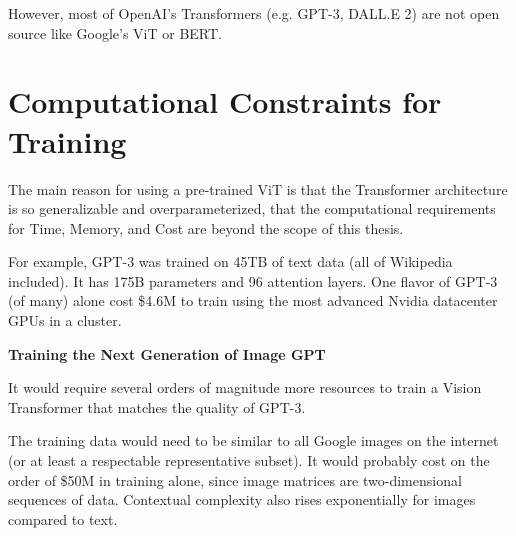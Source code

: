 \vspace{1mm}

However, most of OpenAI's Transformers (e.g. GPT-3, DALL.E 2) are not open source like Google's ViT or BERT.


\section{Computational Constraints for Training}


The main reason for using a pre-trained ViT is that the Transformer architecture is so generalizable and 
overparameterized, that the computational requirements for Time, Memory, and Cost are beyond the scope of this thesis.


For example, GPT-3 was trained on 45TB of text data (all of Wikipedia included). It has 175B parameters and 96 attention layers. \citep{GPT3}
One flavor of GPT-3 (of many) alone cost \$4.6M to train using the most advanced Nvidia datacenter GPUs in a cluster.

\vspace{10mm}

\textbf{Training the Next Generation of Image GPT}

It would require several orders of magnitude more resources to train a Vision Transformer that matches the quality of GPT-3.

The training data would need to be similar to all Google images on the internet (or at least a respectable representative subset).
It would probably cost on the order of \$50M in training alone, since image matrices are two-dimensional sequences of data.
Contextual complexity also rises exponentially for images compared to text.










